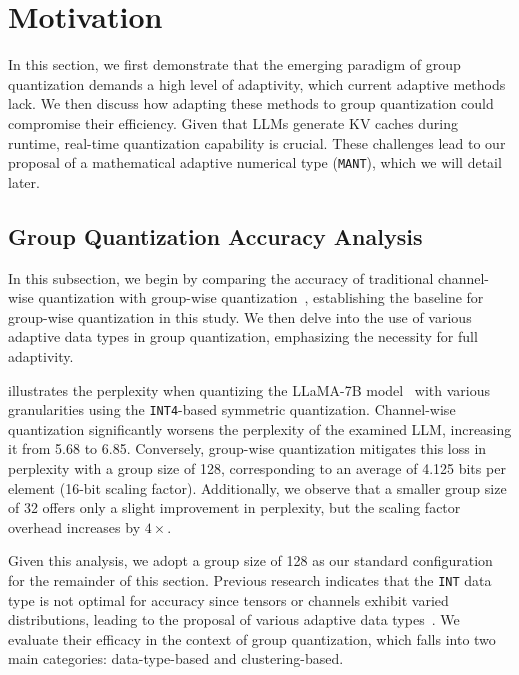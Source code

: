 \section{Motivation}
\label{sec:motivation}



In this section, we first demonstrate that the emerging paradigm of group quantization demands a high level of adaptivity, which current adaptive methods lack.
We then discuss how adapting these methods to group quantization could compromise their efficiency.
Given that LLMs generate KV caches during runtime, real-time quantization capability is crucial.
These challenges lead to our proposal of a mathematical adaptive numerical type (\texttt{MANT}), which we will detail later.








\subsection{Group Quantization Accuracy Analysis}
\label{sec:acc_analysis}

In this subsection, we begin by comparing the accuracy of traditional channel-wise quantization with group-wise quantization~\cite{shao2024omniquant,zhao2023atom,liu2024kivi,sheng2023flexgen,lin2023awq,zhao2023atom}, establishing the baseline for group-wise quantization in this study.
We then delve into the use of various adaptive data types in group quantization, emphasizing the necessity for full adaptivity.



 illustrates the perplexity when quantizing the LLaMA-7B model~\cite{touvron2023llama} with various granularities using the \texttt{INT4}-based symmetric quantization.
Channel-wise quantization significantly worsens the perplexity of the examined LLM, increasing it from 5.68 to 6.85.
Conversely, group-wise quantization mitigates this loss in perplexity with a group size of 128, corresponding to an average of 4.125 bits per element (16-bit scaling factor).
Additionally, we observe that a smaller group size of 32 offers only a slight improvement in perplexity, but the scaling factor overhead increases by $4\times$.



Given this analysis, we adopt a group size of 128 as our standard configuration for the remainder of this section.
Previous research indicates that the \texttt{INT} data type is not optimal for accuracy since tensors or channels exhibit varied distributions, leading to the proposal of various adaptive data types~\cite{guo2022ant, guo2023olive, zadeh2020gobo, zadeh2022mokey}.
We evaluate their efficacy in the context of group quantization, which falls into two main categories: data-type-based and clustering-based.



